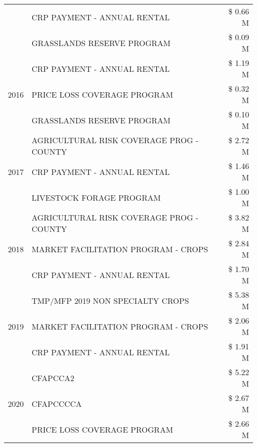 \begin{tabular}{llr}
 & CRP PAYMENT - ANNUAL RENTAL & \$ 0.66 M \\
 & GRASSLANDS RESERVE PROGRAM & \$ 0.09 M \\
\cline{1-3}
\multirow[t]{3}{*}{2016} & CRP PAYMENT - ANNUAL RENTAL & \$ 1.19 M \\
 & PRICE LOSS COVERAGE PROGRAM & \$ 0.32 M \\
 & GRASSLANDS RESERVE PROGRAM & \$ 0.10 M \\
\cline{1-3}
\multirow[t]{3}{*}{2017} & AGRICULTURAL RISK COVERAGE PROG - COUNTY & \$ 2.72 M \\
 & CRP PAYMENT - ANNUAL RENTAL & \$ 1.46 M \\
 & LIVESTOCK FORAGE PROGRAM & \$ 1.00 M \\
\cline{1-3}
\multirow[t]{3}{*}{2018} & AGRICULTURAL RISK COVERAGE PROG - COUNTY & \$ 3.82 M \\
 & MARKET FACILITATION PROGRAM - CROPS & \$ 2.84 M \\
 & CRP PAYMENT - ANNUAL RENTAL & \$ 1.70 M \\
\cline{1-3}
\multirow[t]{3}{*}{2019} & TMP/MFP 2019 NON SPECIALTY CROPS & \$ 5.38 M \\
 & MARKET FACILITATION PROGRAM - CROPS & \$ 2.06 M \\
 & CRP PAYMENT - ANNUAL RENTAL & \$ 1.91 M \\
\cline{1-3}
\multirow[t]{3}{*}{2020} & CFAPCCA2 & \$ 5.22 M \\
 & CFAPCCCCA & \$ 2.67 M \\
 & PRICE LOSS COVERAGE PROGRAM & \$ 2.66 M \\
\cline{1-3}
\bottomrule
\end{tabular}
